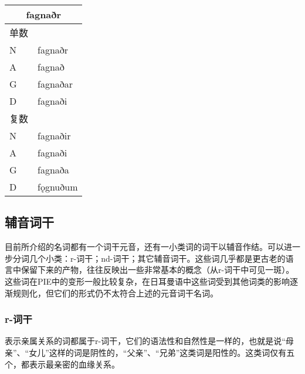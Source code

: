 \begin{longtable}{ll}
  \toprule
  \multicolumn{2}{c}{\textbf{fagnaðr}} \\
  \midrule
  \endhead
  \bottomrule
  \endfoot
  单数 &                                 \\
  N  & fagnaðr                         \\
  A  & fagnað                          \\
  G  & fagnaðar                        \\
  D  & fagnaði                         \\
  复数 &                                 \\
  N  & fagnaðir                        \\
  A  & fagnaði                         \\
  G  & fagnaða                         \\
  D  & fǫgnuðum                        \\
\end{longtable}

\subsection{辅音词干}
\label{辅音词干}

目前所介绍的名词都有一个词干元音，还有一小类词的词干以辅音作结。可以进一步分词几个小类：r-词干；nd-词干；其它辅音词干。这些词几乎都是更古老的语言中保留下来的产物，往往反映出一些非常基本的概念（从r-词干中可见一斑）。这些词在PIE中的变形一般比较复杂，在日耳曼语中这些词受到其他词类的影响逐渐规则化，但它们的形式仍不太符合上述的元音词干名词。

\subsubsection{r-词干}

表示亲属关系的词都属于r-词干，它们的语法性和自然性是一样的，也就是说``母亲''、``女儿''这样的词是阴性的，``父亲''、``兄弟''这类词是阳性的。这类词仅有五个，都表示最亲密的血缘关系。

